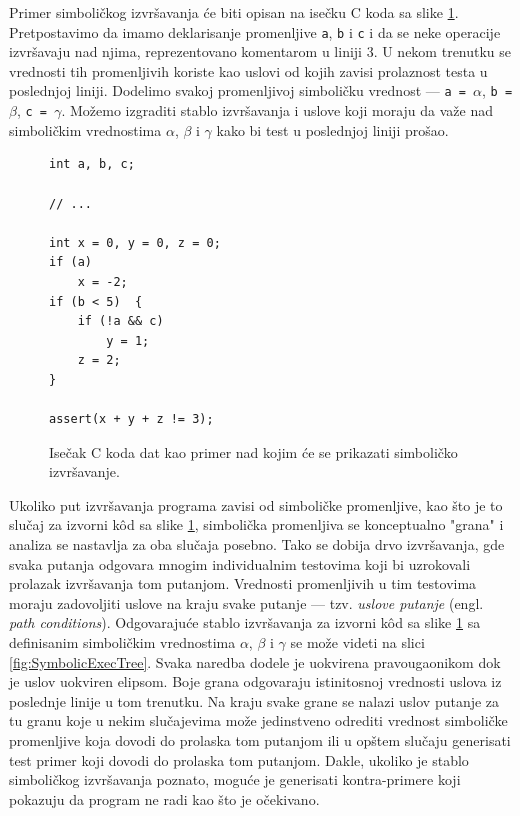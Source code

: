 Primer simboličkog izvršavanja će biti opisan na isečku C koda sa slike \ref{fig:SymbolicExecCode}. Pretpostavimo da imamo deklarisanje promenljive \texttt{a}, \texttt{b} i \texttt{c} i da se neke operacije izvršavaju nad njima, reprezentovano komentarom u liniji $3$. U nekom trenutku se vrednosti tih promenljivih koriste kao uslovi od kojih zavisi prolaznost testa u poslednjoj liniji. Dodelimo svakoj promenljivoj simboličku vrednost --- \texttt{a = }$\alpha$, \texttt{b = }$\beta$, \texttt{c = }$\gamma$. Možemo izgraditi stablo izvršavanja i uslove koji moraju da važe nad simboličkim vrednostima $\alpha$, $\beta$ i $\gamma$ kako bi test u poslednjoj liniji prošao.

\begin{figure}[h!]
\begin{lstlisting}[language={}]
int a, b, c;

// ...

int x = 0, y = 0, z = 0;
if (a)      
    x = -2;
if (b < 5)  {
    if (!a && c)    
        y = 1;
    z = 2;
}

assert(x + y + z != 3);
\end{lstlisting}
\caption{Isečak C koda dat kao primer nad kojim će se prikazati simboličko izvršavanje.}
\label{fig:SymbolicExecCode}
\end{figure}

Ukoliko put izvršavanja programa zavisi od simboličke promenljive, kao što je to slučaj za izvorni k\^od sa slike \ref{fig:SymbolicExecCode}, simbolička promenljiva se konceptualno "grana" i analiza se nastavlja za oba slučaja posebno. Tako se dobija drvo izvršavanja, gde svaka putanja odgovara mnogim individualnim testovima koji bi uzrokovali prolazak izvršavanja tom putanjom. Vrednosti promenljivih u tim testovima moraju zadovoljiti uslove na kraju svake putanje --- tzv. \emph{uslove putanje} (engl. \emph{path conditions}). Odgovarajuće stablo izvršavanja za izvorni k\^od sa slike \ref{fig:SymbolicExecCode} sa definisanim simboličkim vrednostima $\alpha$, $\beta$ i $\gamma$ se može videti na slici \ref{fig:SymbolicExecTree}. Svaka naredba dodele je uokvirena pravougaonikom dok je uslov uokviren elipsom. Boje grana odgovaraju istinitosnoj vrednosti uslova iz poslednje linije u tom trenutku. Na kraju svake grane se nalazi uslov putanje za tu granu koje u nekim slučajevima može jedinstveno odrediti vrednost simboličke promenljive koja dovodi do prolaska tom putanjom ili u opštem slučaju generisati test primer koji dovodi do prolaska tom putanjom. Dakle, ukoliko je stablo simboličkog izvršavanja poznato, moguće je generisati kontra-primere koji pokazuju da program ne radi kao što je očekivano.


